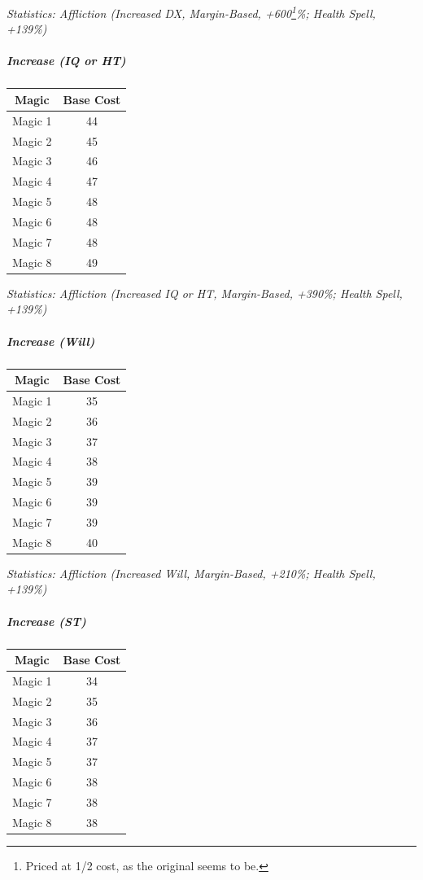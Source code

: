 \begin{multicols*}{3}
	\textcolor{OliveGreen}{\textit{Statistics: Affliction (Increased DX, Margin-Based, +600\footnote{Priced at 1/2 cost, as the original seems to be.}\%; Health Spell, +139\%) }}
	
	\subparagraph{Increase (IQ or HT)}
	
	\begin{center}
		\begin{tabular}{|c|c|}
			\hline
			Magic & Base Cost \\
			\hline
			\hline
			Magic 1 & 44 \\
			Magic 2 & 45 \\
			Magic 3 & 46  \\
			Magic 4 & 47 \\
			Magic 5 & 48 \\
			Magic 6 & 48 \\
			Magic 7 & 48 \\
			Magic 8 & 49 \\
			\hline
		\end{tabular}
	\end{center}	
	
	\textcolor{OliveGreen}{\textit{Statistics: Affliction (Increased IQ or HT, Margin-Based, +390\%; Health Spell, +139\%) }}
	
	\subparagraph{Increase (Will)}
	
	\begin{center}
		\begin{tabular}{|c|c|}
			\hline
			Magic & Base Cost \\
			\hline
			\hline
			Magic 1 & 35 \\
			Magic 2 & 36 \\
			Magic 3 & 37 \\
			Magic 4 & 38 \\
			Magic 5 & 39 \\
			Magic 6 & 39 \\
			Magic 7 & 39 \\
			Magic 8 & 40 \\
			\hline
		\end{tabular}
	\end{center}	
	
	\textcolor{OliveGreen}{\textit{Statistics: Affliction (Increased Will, Margin-Based, +210\%; Health Spell, +139\%) }}
	
	\subparagraph{Increase (ST)}
	
	\begin{center}
		\begin{tabular}{|c|c|}
			\hline
			Magic & Base Cost \\
			\hline
			\hline
			Magic 1 & 34 \\
			Magic 2 & 35 \\
			Magic 3 & 36 \\
			Magic 4 & 37 \\
			Magic 5 & 37 \\
			Magic 6 & 38 \\
			Magic 7 & 38 \\
			Magic 8 & 38 \\
			\hline
		\end{tabular}
	\end{center}	
	

\end{multicols*}
